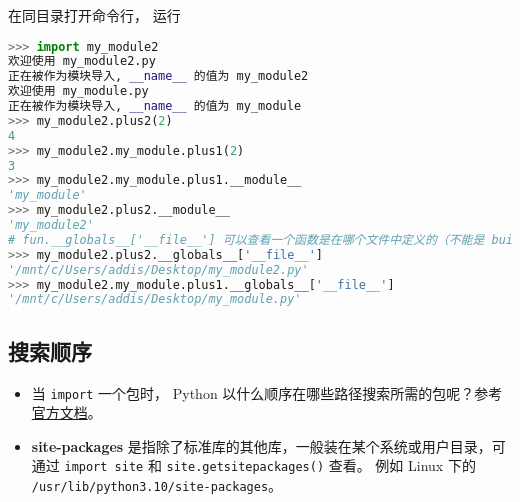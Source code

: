 在同目录打开命令行， 运行
\begin{lstlisting}[language=python]
>>> import my_module2
欢迎使用 my_module2.py
正在被作为模块导入, __name__ 的值为 my_module2
欢迎使用 my_module.py
正在被作为模块导入, __name__ 的值为 my_module
>>> my_module2.plus2(2)
4
>>> my_module2.my_module.plus1(2)
3
>>> my_module2.my_module.plus1.__module__
'my_module'
>>> my_module2.plus2.__module__
'my_module2'
# fun.__globals__['__file__'] 可以查看一个函数是在哪个文件中定义的（不能是 builtin 函数）。
>>> my_module2.plus2.__globals__['__file__']
'/mnt/c/Users/addis/Desktop/my_module2.py'
>>> my_module2.my_module.plus1.__globals__['__file__']
'/mnt/c/Users/addis/Desktop/my_module.py'
\end{lstlisting}

\subsection{搜索顺序}
\begin{itemize}
\item 当 \verb`import` 一个包时， Python 以什么顺序在哪些路径搜索所需的包呢？参考\href{https://docs.python.org/3/tutorial/modules.html#the-module-search-path}{官方文档}。
\item \textbf{site-packages} 是指除了标准库的其他库，一般装在某个系统或用户目录，可通过 \verb`import site` 和 \verb`site.getsitepackages()` 查看。  例如 Linux 下的 \verb`/usr/lib/python3.10/site-packages`。
\end{itemize}
